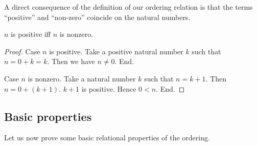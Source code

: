 \documentclass[../../arithmetic.ftl.tex]{subfiles}
\begin{document}
  A direct consequence of the definition of our ordering relation
  is that the terms \enquote{positive} and \enquote{non-zero}
  coincide on the natural numbers.

  \begin{forthel}
    \begin{proposition}\label{Arithmetic_02_01_115117}
      $n$ is positive iff $n$ is nonzero.
    \end{proposition}
    \begin{proof}
      Case $n$ is positive.
        Take a positive natural number $k$ such that $n = 0 + k = k$.
        Then we have $n \neq 0$.
      End.

      Case $n$ is nonzero.
        Take a natural number $k$ such that $n = k + 1$.
        Then $n = 0 + (k + 1)$.
        $k + 1$ is positive.
        Hence $0 < n$.
      End.
    \end{proof}
  \end{forthel}


  \subsection{Basic properties}

  Let us now prove some basic relational properties of the
  ordering.
\end{document}

